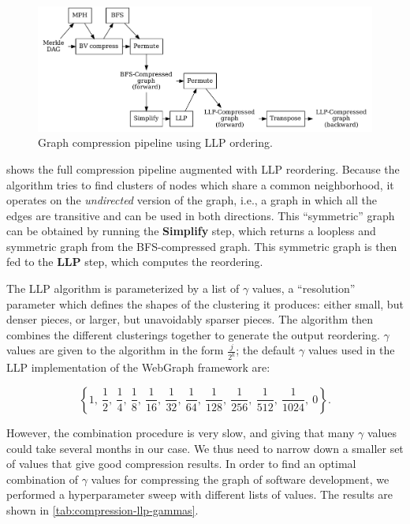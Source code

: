 \begin{figure}
  \centering
  \includegraphics[width=\linewidth]{img/compression/compression_steps_llp}
    \caption{Graph compression pipeline using \gls{LLP} ordering.}%
  \label{fig:llp-compression-pipeline}
\end{figure}

 shows the full compression pipeline
augmented with \gls{LLP} reordering. Because the algorithm tries to find
clusters of nodes which share a common neighborhood, it operates on the
\emph{undirected} version of the graph, i.e., a graph in which all the edges
are transitive and can be used in both directions. This ``symmetric'' graph can
be obtained by running the \textbf{Simplify} step, which returns a loopless and
symmetric graph from the \gls{BFS}-compressed graph. This symmetric graph is
then fed to the \textbf{LLP} step, which computes the reordering.

The \gls{LLP} algorithm is parameterized by a list of $\gamma$ values, a
``resolution'' parameter which defines the shapes of the clustering it
produces: either small, but denser pieces, or larger, but unavoidably sparser
pieces. The algorithm then combines the different clusterings together to
generate the output reordering. $\gamma$ values are given to the algorithm in
the form $\displaystyle \frac{j}{2^k}$; the default $\gamma$ values used in the
\gls{LLP} implementation of the WebGraph framework are:

\[
    \left\{
    1,~\frac{1}{2},~\frac{1}{4},~\frac{1}{8},~\frac{1}{16},~\frac{1}{32},~%
    \frac{1}{64},~\frac{1}{128},~\frac{1}{256},~\frac{1}{512},~\frac{1}{1024},~0
    \right\}.
\]

However, the combination procedure is very slow, and giving that many $\gamma$
values could take several months in our case. We thus need to narrow down a
smaller set of values that give good compression results.
In order to find an
optimal combination of $\gamma$ values for compressing the graph of software
development, we performed a hyperparameter sweep with different lists of
values. The results are shown in \cref{tab:compression-llp-gammas}.

